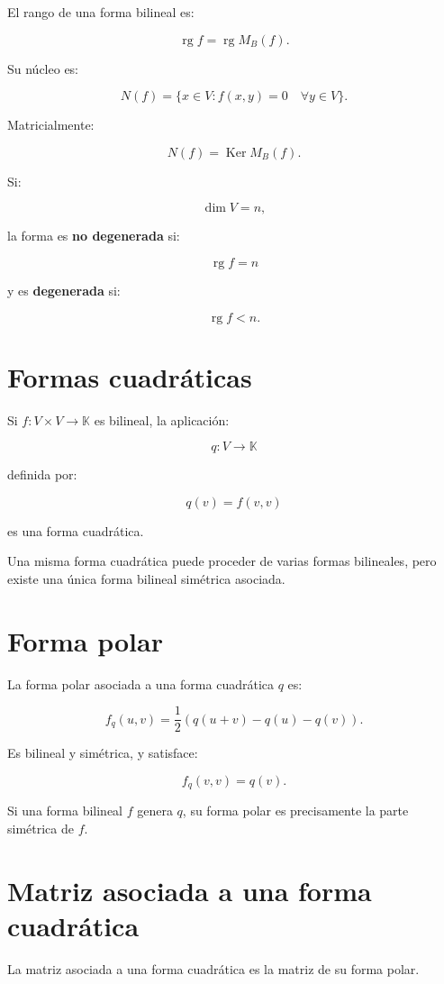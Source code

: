 \documentclass[11pt,a4paper]{article}
\newcommand{\K}{\mathbb{K}}
\newcommand{\Ker}{\operatorname{Ker}}
\newcommand{\rg}{\operatorname{rg}}
\begin{document}
El rango de una forma bilineal es:

\[
\boxed{
\rg f=\rg M_B(f).
}
\]

Su núcleo es:

\[
\boxed{
N(f)
=
\{x\in V:f(x,y)=0\quad\forall y\in V\}.
}
\]

Matricialmente:

\[
\boxed{
N(f)=\Ker M_B(f).
}
\]

Si:

\[
\dim V=n,
\]

la forma es \textbf{no degenerada} si:

\[
\boxed{
\rg f=n
}
\]

y es \textbf{degenerada} si:

\[
\boxed{
\rg f<n.
}
\]

\section{Formas cuadráticas}

Si $f:V\times V\to\K$ es bilineal, la aplicación:

\[
q:V\longrightarrow\K
\]

definida por:

\[
\boxed{
q(v)=f(v,v)
}
\]

es una forma cuadrática.

Una misma forma cuadrática puede proceder de varias formas bilineales, pero existe una única forma bilineal simétrica asociada.

\section{Forma polar}

La forma polar asociada a una forma cuadrática $q$ es:

\[
\boxed{
f_q(u,v)
=
\frac12
\left(
q(u+v)-q(u)-q(v)
\right).
}
\]

Es bilineal y simétrica, y satisface:

\[
\boxed{
f_q(v,v)=q(v).
}
\]

Si una forma bilineal $f$ genera $q$, su forma polar es precisamente la parte simétrica de $f$.

\section{Matriz asociada a una forma cuadrática}

La matriz asociada a una forma cuadrática es la matriz de su forma polar.
\end{document}
